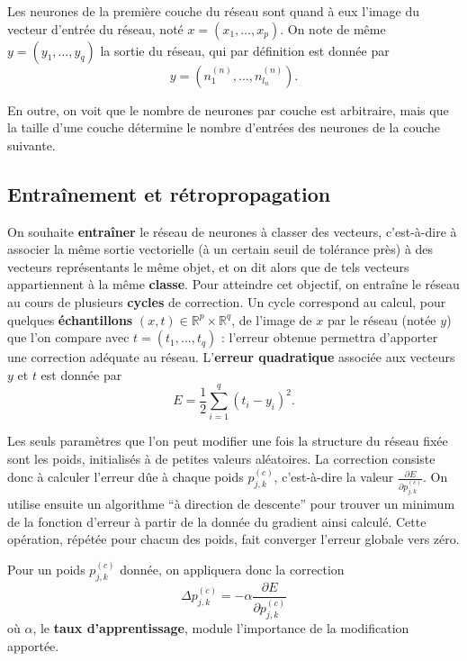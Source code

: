 \documentclass[12pt]{article}
\newcommand{\lc}[1]{l_{#1}}
\newcommand{\neurone}[2]{n_{ #1 }^{ (#2) }}
\newcommand{\poids}[3]{p_{#1,#2}^{ (#3) }}
\begin{document}
		Les neurones de la première couche du réseau sont quand à eux l'image du vecteur d'entrée du réseau, noté $x = (x_1, \ldots, x_p)$. On note de même $y = (y_1, \ldots, y_q)$ la sortie du réseau, qui par définition est donnée par
		\begin{equation*}
			y = (\neurone{1}{n}, \ldots, \neurone{\lc{n}}{n}).
		\end{equation*}

		En outre, on voit que le nombre de neurones par couche est arbitraire, mais que la taille d'une couche détermine le nombre d'entrées des neurones de la couche suivante.

	\subsection{Entraînement et rétropropagation}

		On souhaite \textbf{entraîner} le réseau de neurones à classer des vecteurs, c'est-à-dire à associer la même sortie vectorielle (à un certain seuil de tolérance près) à des vecteurs représentants le même objet, et on dit alors que de tels vecteurs appartiennent à la même \textbf{classe}. Pour atteindre cet objectif, on entraîne le réseau au cours de plusieurs \textbf{cycles} de correction. Un cycle correspond au calcul, pour quelques \textbf{échantillons} $(x, t) \in \mathbb{R}^p \times \mathbb{R}^q$, de l'image de $x$ par le réseau (notée $y$) que l'on compare avec $t = (t_1, \ldots, t_q)$ : l'erreur obtenue permettra d'apporter une correction adéquate au réseau. L'\textbf{erreur quadratique} associée aux vecteurs $y$ et $t$ est donnée par
		\begin{equation}
			E = \frac{1}{2} \sum_{i=1}^q (t_i - y_i)^2.
		\end{equation}

		Les seuls paramètres que l'on peut modifier une fois la structure du réseau fixée sont les poids, initialisés à de petites valeurs aléatoires. La correction consiste donc à calculer l'erreur dûe à chaque poids $\poids{j}{k}{c}$, c'est-à-dire la valeur $\frac{\partial E}{\partial \poids{j}{k}{c}}$. On utilise ensuite un algorithme ``à direction de descente'' pour trouver un minimum de la fonction d'erreur à partir de la donnée du gradient ainsi calculé. Cette opération, répétée pour chacun des poids, fait converger l'erreur globale vers zéro.

		Pour un poids $\poids{j}{k}{c}$ donnée, on appliquera donc la correction
		\begin{equation}
			\Delta \poids{j}{k}{c} = - \alpha \frac{\partial E}{\partial \poids{j}{k}{c}}
		\end{equation}
		où $\alpha$, le \textbf{taux d'apprentissage}, module l'importance de la modification apportée.
\end{document}
